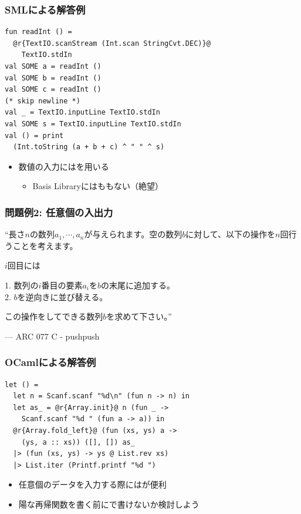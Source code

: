 \documentclass[dvipdfmx,cjk,xcolor=dvipsnames,envcountsect,notheorems,12pt]{beamer}
\theoremstyle{definition}
\begin{document}
\begin{frame}[fragile]
	\frametitle{SMLによる解答例}
	\begin{lstlisting}
fun readInt () =
  @r{TextIO.scanStream (Int.scan StringCvt.DEC)}@
    TextIO.stdIn
val SOME a = readInt ()
val SOME b = readInt ()
val SOME c = readInt ()
(* skip newline *)
val _ = TextIO.inputLine TextIO.stdIn
val SOME s = TextIO.inputLine TextIO.stdIn
val () = print
  (Int.toString (a + b + c) ^ " " ^ s)
\end{lstlisting}
	\begin{itemize}
		\item 数値の入力にはを用いる
			\begin{itemize}
				\item Basis Libraryにはももない（絶望）
			\end{itemize}
	\end{itemize}
\end{frame}

\begin{frame}
	\frametitle{問題例2: 任意個の入出力}
	\begin{block}{}
		{\large ``長さ$n$の数列$a_1,\cdots,a_n$が与えられます。空の数列$b$に対して、以下の操作を$n$回行うことを考えます。

		\smallskip

		$i$回目には

		\smallskip

		1. 数列の$i$番目の要素$a_i$を$b$の末尾に追加する。\\
		2. $b$を逆向きに並び替える。\\

		\smallskip

		この操作をしてできる数列$b$を求めて下さい。''}
		\begin{flushright}
			--- ARC 077 C - pushpush
		\end{flushright}
	\end{block}
\end{frame}

\begin{frame}[fragile]
	\frametitle{OCamlによる解答例}
	\begin{lstlisting}
let () =
  let n = Scanf.scanf "%d\n" (fun n -> n) in
  let as_ = @r{Array.init}@ n (fun _ ->
    Scanf.scanf "%d " (fun a -> a)) in
  @r{Array.fold_left}@ (fun (xs, ys) a ->
    (ys, a :: xs)) ([], []) as_
  |> (fun (xs, ys) -> ys @ List.rev xs)
  |> List.iter (Printf.printf "%d ")
\end{lstlisting}
	\begin{itemize}
		\item 任意個のデータを入力する際にはが便利
		\item 陽な再帰関数を書く前にで書けないか検討しよう
	\end{itemize}
\end{frame}
\end{document}
